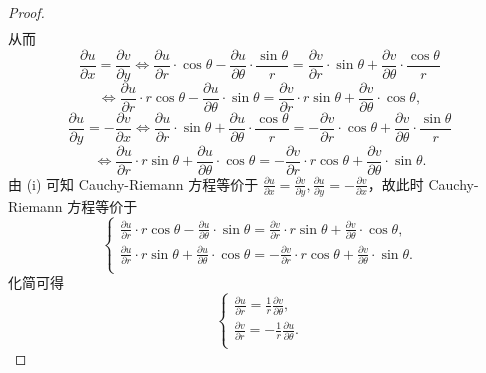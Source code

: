 \documentclass[../../main.tex]{subfiles}%
\begin{document}
\begin{proof}
\begin{gather*}
\end{gather*}
从而
\[
\frac{\partial u}{\partial x} = \frac{\partial v}{\partial y} \Longleftrightarrow \frac{\partial u}{\partial r} \cdot \cos\theta - \frac{\partial u}{\partial \theta} \cdot \frac{\sin\theta}{r} = \frac{\partial v}{\partial r} \cdot \sin\theta + \frac{\partial v}{\partial \theta} \cdot \frac{\cos\theta}{r}
\]
\[
\Longleftrightarrow \frac{\partial u}{\partial r} \cdot r\cos\theta - \frac{\partial u}{\partial \theta} \cdot \sin\theta = \frac{\partial v}{\partial r} \cdot r\sin\theta + \frac{\partial v}{\partial \theta} \cdot \cos\theta,
\]
\[
\frac{\partial u}{\partial y} = -\frac{\partial v}{\partial x} \Longleftrightarrow \frac{\partial u}{\partial r} \cdot \sin\theta + \frac{\partial u}{\partial \theta} \cdot \frac{\cos\theta}{r} = -\frac{\partial v}{\partial r} \cdot \cos\theta + \frac{\partial v}{\partial \theta} \cdot \frac{\sin\theta}{r}
\]
\[
\Longleftrightarrow \frac{\partial u}{\partial r} \cdot r\sin\theta + \frac{\partial u}{\partial \theta} \cdot \cos\theta = -\frac{\partial v}{\partial r} \cdot r\cos\theta + \frac{\partial v}{\partial \theta} \cdot \sin\theta.
\]
由 (i) 可知 Cauchy-Riemann 方程等价于 \( \frac{\partial u}{\partial x} = \frac{\partial v}{\partial y}, \frac{\partial u}{\partial y} = -\frac{\partial v}{\partial x} \)，故此时 Cauchy-Riemann 方程等价于
\[
\begin{cases}
\frac{\partial u}{\partial r} \cdot r\cos\theta - \frac{\partial u}{\partial \theta} \cdot \sin\theta = \frac{\partial v}{\partial r} \cdot r\sin\theta + \frac{\partial v}{\partial \theta} \cdot \cos\theta, \\
\frac{\partial u}{\partial r} \cdot r\sin\theta + \frac{\partial u}{\partial \theta} \cdot \cos\theta = -\frac{\partial v}{\partial r} \cdot r\cos\theta + \frac{\partial v}{\partial \theta} \cdot \sin\theta. \\
\end{cases}
\]
化简可得
\[
\begin{cases}
\frac{\partial u}{\partial r} = \frac{1}{r}\frac{\partial v}{\partial \theta}, \\
\frac{\partial v}{\partial r} = -\frac{1}{r}\frac{\partial u}{\partial \theta}. \\
\end{cases}
\]

\end{proof}
\end{document}
